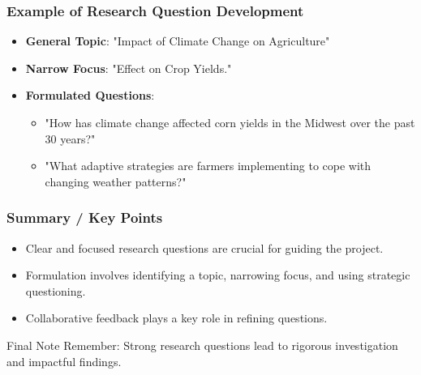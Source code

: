 \documentclass[aspectratio=169]{beamer}
\begin{document}
\begin{frame}[fragile]
    \frametitle{Example of Research Question Development}
    \begin{itemize}
        \item \textbf{General Topic}: "Impact of Climate Change on Agriculture"
        \item \textbf{Narrow Focus}: "Effect on Crop Yields."
        \item \textbf{Formulated Questions}:
              \begin{itemize}
                  \item "How has climate change affected corn yields in the Midwest over the past 30 years?"
                  \item "What adaptive strategies are farmers implementing to cope with changing weather patterns?"
              \end{itemize}
    \end{itemize}
\end{frame}

\begin{frame}[fragile]
    \frametitle{Summary / Key Points}
    \begin{itemize}
        \item Clear and focused research questions are crucial for guiding the project.
        \item Formulation involves identifying a topic, narrowing focus, and using strategic questioning.
        \item Collaborative feedback plays a key role in refining questions.
    \end{itemize}
    \begin{block}{Final Note}
        Remember: Strong research questions lead to rigorous investigation and impactful findings.
    \end{block}
\end{frame}
\end{document}
